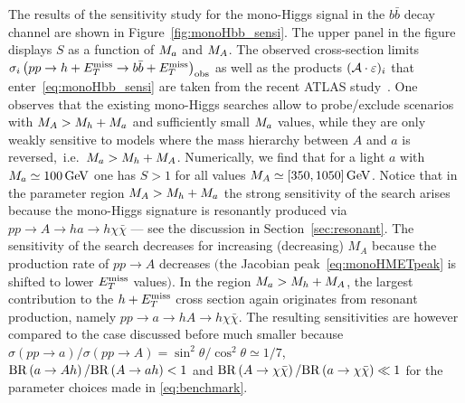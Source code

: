 The results of the sensitivity study for the mono-Higgs signal in the $b \bar b$ decay channel are shown in Figure~\ref{fig:monoHbb_sensi}. The upper panel in the figure displays $S$  as a function of $M_{a}$ and $M_{A}$. The observed cross-section limits $\sigma_{i} \left ( p p \to h + E_T^\mathrm{miss} \to b \bar b + E_T^\mathrm{miss} \right)_{\rm obs}$ as well as the products $({\cal A} \cdot  \varepsilon)_i$ that enter~\eqref{eq:monoHbb_sensi}  are  taken from the recent ATLAS study~\cite{Aaboud:2017yqz}. One observes that the existing mono-Higgs searches allow to probe/exclude \hdma scenarios with  $M_{A} > M_h + M_{a}$  and sufficiently small $M_{a}$ values, while they are only weakly  sensitive to models where the mass hierarchy between $A$ and $a$ is reversed,~i.e.~$M_{a} > M_h + M_{A}$. Numerically, we find that  for  a light $a$ with $M_{a} \simeq 100 \, {\rm GeV}$ one has $S > 1$ for all values $M_{A} \simeq [350, 1050] \, {\rm GeV}$. Notice that in the parameter region  $M_{A} > M_h + M_{a}$ the strong sensitivity of the search arises because the mono-Higgs signature is resonantly produced via $pp \to A \to ha \to h \chi \bar \chi$ --- see the discussion in Section~\ref{sec:resonant}. The sensitivity of the search decreases for increasing (decreasing) $M_A$ because the production rate of $pp \to A$  decreases $\big($the Jacobian peak~\eqref{eq:monoHMETpeak} is shifted to lower $E_T^\mathrm{miss}$ values$\big)$. In the region $M_{a} > M_h + M_{A}$, the largest contribution to the $h + E_T^\mathrm{miss}$ cross section again originates from resonant production, namely $pp \to a \to hA \to h \chi \bar \chi$. The resulting sensitivities are however compared to the case discussed before much smaller because  $\sigma \left (p p \to a \right )/\sigma \left (pp \to A \right ) = \sin^2 \theta/\cos^2 \theta \simeq 1/7$, ${\rm BR} \left ( a \to A h \right )/{\rm BR} \left (  A \to a h  \right ) < 1$ and ${\rm BR} \left ( A \to \chi \bar \chi \right )/{\rm BR} \left (  a \to \chi \bar \chi \right ) \ll 1$ for the parameter choices made in \eqref{eq:benchmark}. 

